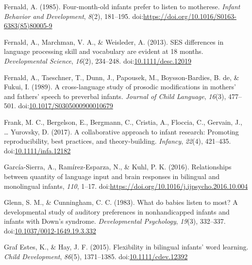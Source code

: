 \documentclass[,man,floatsintext]{apa6}
\begin{document}
\leavevmode\hypertarget{ref-fernald_1985}{}%
Fernald, A. (1985). Four-month-old infants prefer to listen to motherese. \emph{Infant Behavior and Development}, \emph{8}(2), 181--195. doi:\href{https://doi.org/https://doi.org/10.1016/S0163-6383(85)80005-9}{https://doi.org/10.1016/S0163-6383(85)80005-9}

\leavevmode\hypertarget{ref-fernald_2013}{}%
Fernald, A., Marchman, V. A., \& Weisleder, A. (2013). SES differences in language processing skill and vocabulary are evident at 18 months. \emph{Developmental Science}, \emph{16}(2), 234--248. doi:\href{https://doi.org/10.1111/desc.12019}{10.1111/desc.12019}

\leavevmode\hypertarget{ref-fernald_1989}{}%
Fernald, A., Taeschner, T., Dunn, J., Papousek, M., Boysson-Bardies, B. de, \& Fukui, I. (1989). A cross-language study of prosodic modifications in mothers' and fathers' speech to preverbal infants. \emph{Journal of Child Language}, \emph{16}(3), 477--501. doi:\href{https://doi.org/10.1017/S0305000900010679}{10.1017/S0305000900010679}

\leavevmode\hypertarget{ref-frank_2017}{}%
Frank, M. C., Bergelson, E., Bergmann, C., Cristia, A., Floccia, C., Gervain, J., \ldots{} Yurovsky, D. (2017). A collaborative approach to infant research: Promoting reproducibility, best practices, and theory-building. \emph{Infancy}, \emph{22}(4), 421--435. doi:\href{https://doi.org/10.1111/infa.12182}{10.1111/infa.12182}

\leavevmode\hypertarget{ref-garcia_sierra_2016}{}%
García-Sierra, A., Ramírez-Esparza, N., \& Kuhl, P. K. (2016). Relationships between quantity of language input and brain responses in bilingual and monolingual infants, \emph{110}, 1--17. doi:\href{https://doi.org/https://doi.org/10.1016/j.ijpsycho.2016.10.004}{https://doi.org/10.1016/j.ijpsycho.2016.10.004}

\leavevmode\hypertarget{ref-glenn_1983}{}%
Glenn, S. M., \& Cunningham, C. C. (1983). What do babies listen to most? A developmental study of auditory preferences in nonhandicapped infants and infants with Down's syndrome. \emph{Developmental Psychology}, \emph{19}(3), 332--337. doi:\href{https://doi.org/10.1037/0012-1649.19.3.332}{10.1037/0012-1649.19.3.332}

\leavevmode\hypertarget{ref-graf_estes_2015}{}%
Graf Estes, K., \& Hay, J. F. (2015). Flexibility in bilingual infants' word learning. \emph{Child Development}, \emph{86}(5), 1371--1385. doi:\href{https://doi.org/10.1111/cdev.12392}{10.1111/cdev.12392}
\end{document}
